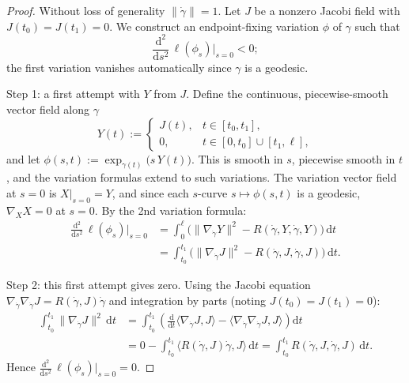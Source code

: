 \begin{proof}
Without loss of generality $\|\dot\gamma\| = 1$. Let $J$ be a nonzero Jacobi field with $J(t_0) = J(t_1) = 0$. We construct an endpoint-fixing variation $\phi$ of $\gamma$ such that
\[
\frac{\mathrm{d}^2}{\mathrm{d}s^2}\,\ell(\phi_s)\bigg|_{s=0} < 0;
\]
the first variation vanishes automatically since $\gamma$ is a geodesic.

{Step 1: a first attempt with $Y$ from $J$.}
Define the continuous, piecewise-smooth vector field along $\gamma$
\[
Y(t) := \begin{cases} J(t), & t \in [t_0, t_1], \\ 0, & t \in [0, t_0] \cup [t_1, \ell], \end{cases}
\]
and let $\phi(s, t) := \exp_{\gamma(t)}\!\big(s\, Y(t)\big)$. This is smooth in $s$, piecewise smooth in $t$, and the variation formulas extend to such variations. The variation vector field at $s = 0$ is $X|_{s = 0} = Y$, and since each $s$-curve $s \mapsto \phi(s, t)$ is a geodesic, $\nabla_X X = 0$ at $s = 0$. By the 2nd variation formula:
\begin{align*}
\frac{\mathrm{d}^2}{\mathrm{d}s^2}\,\ell(\phi_s)\bigg|_{s = 0} 
&= \int_0^\ell \big(\|\nabla_{\dot\gamma} Y\|^2 - R(\dot\gamma, Y, \dot\gamma, Y)\big)\,\mathrm{d}t \\
&= \int_{t_0}^{t_1} \big(\|\nabla_{\dot\gamma} J\|^2 - R(\dot\gamma, J, \dot\gamma, J)\big)\,\mathrm{d}t.
\end{align*}

{Step 2: this first attempt gives zero.}
Using the Jacobi equation $\nabla_{\dot\gamma}\nabla_{\dot\gamma} J = R(\dot\gamma, J)\dot\gamma$ and integration by parts (noting $J(t_0) = J(t_1) = 0$):
\begin{align*}
\int_{t_0}^{t_1} \|\nabla_{\dot\gamma} J\|^2\,\mathrm{d}t 
&= \int_{t_0}^{t_1} \left(\tfrac{\mathrm{d}}{\mathrm{d}t}\langle \nabla_{\dot\gamma} J, J\rangle - \langle \nabla_{\dot\gamma}\nabla_{\dot\gamma} J, J\rangle\right) \mathrm{d}t \\
&= 0 - \int_{t_0}^{t_1} \langle R(\dot\gamma, J)\dot\gamma, J\rangle\,\mathrm{d}t = \int_{t_0}^{t_1} R(\dot\gamma, J, \dot\gamma, J)\,\mathrm{d}t.
\end{align*}
Hence $\frac{\mathrm{d}^2}{\mathrm{d}s^2}\,\ell(\phi_s)\big|_{s = 0} = 0$.


\end{proof}
